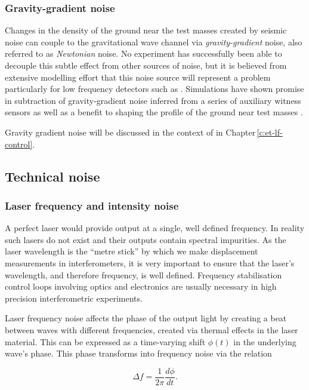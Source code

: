 \subsubsection{\label{sec:gravity-gradient-noise}Gravity-gradient noise}
Changes in the density of the ground near the test masses created by seismic noise can couple to the gravitational wave channel via \emph{gravity-gradient} noise, also referred to as \emph{Newtonian} noise. No experiment has successfully been able to decouple this subtle effect from other sources of noise, but it is believed from extensive modelling effort that this noise source will represent a problem particularly for low frequency detectors such as \ETLF{} \cite{ET2011, Hild2011}. Simulations have shown promise in subtraction of gravity-gradient noise inferred from a series of auxiliary witness sensors \cite{Harms2015} as well as a benefit to shaping the profile of the ground near test masses \cite{Harms2014}.

Gravity gradient noise will be discussed in the context of \ETLF{} in Chapter\,\ref{c:et-lf-control}.

\subsection{Technical noise}

\subsubsection{\label{sec:laser-noise}Laser frequency and intensity noise}
A perfect laser would provide output at a single, well defined frequency. In reality such lasers do not exist and their outputs contain spectral impurities. As the laser wavelength is the ``metre stick'' by which we make displacement measurements in interferometers, it is very important to ensure that the laser's wavelength, and therefore frequency, is well defined. Frequency stabilisation control loops involving optics and electronics are usually necessary in high precision interferometric experiments.

Laser frequency noise affects the phase of the output light by creating a beat between waves with different frequencies, created via thermal effects in the laser material. This can be expressed as a time-varying shift $\phi \left( t \right)$ in the underlying wave's phase. This phase transforms into frequency noise via the relation

\begin{equation}
  \Delta f = \frac{1}{2 \pi} \frac{d \phi}{dt}.
\end{equation}

